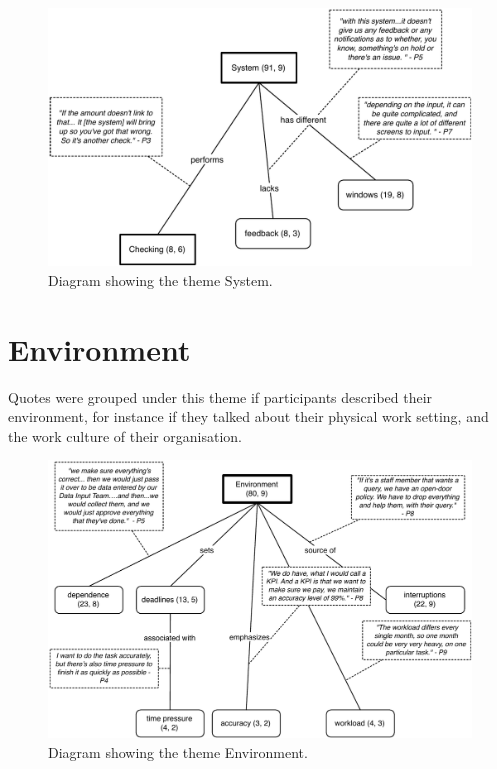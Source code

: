 \begin{figure}[!ht]
\centering
\includegraphics[width=\textwidth]{images/ch12/System.pdf}
\caption[Study 1 System diagram]{Diagram showing the theme System.}
\vspace{-9pt}
\label{fig:ch3_system}
\end{figure}

\section{Environment}
Quotes were grouped under this theme if participants described their environment, for instance if they talked about their physical work setting, and the work culture of their organisation. 

\begin{figure}[!ht]
\centering
\includegraphics[width=\textwidth]{images/ch12/Environment.pdf}
\caption[Study 1 Environment diagram]{Diagram showing the theme Environment.}
\vspace{-9pt}
\label{fig:ch3_environment}
\end{figure}

